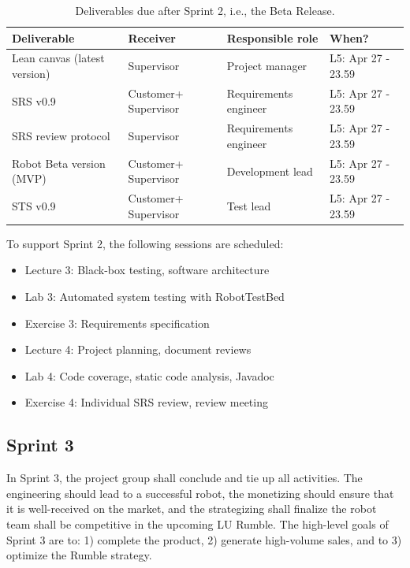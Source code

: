 \documentclass{scrreprt}
\begin{document}
\begin{table}[]
\centering
\caption{Deliverables due after Sprint 2, i.e., the Beta Release.}
\label{tab:sprint2}
\begin{tabular}{|p{4cm}|p{2cm}|p{2.5cm}|p{4.5cm}|}
\hline
\textbf{Deliverable}           & \textbf{Receiver}   & \textbf{Responsible role} & \textbf{When?}     \\ \hline
Lean canvas (latest version)   & Supervisor          & Project manager           & L5: Apr 27 - 23.59 \\ \hline
SRS v0.9                       & Customer+ Supervisor & Requirements engineer     & L5: Apr 27 - 23.59 \\ \hline
SRS review protocol            & Supervisor & Requirements engineer     & L5: Apr 27 - 23.59 \\ \hline
Robot Beta version (MVP)       & Customer+ Supervisor & Development lead          & L5: Apr 27 - 23.59  \\ \hline
STS v0.9        			   & Customer+ Supervisor & Test lead                 & L5: Apr 27 - 23.59  \\ \hline
\end{tabular}
\end{table}

To support Sprint 2, the following sessions are scheduled:
\begin{itemize}
\item Lecture 3: Black-box testing, software architecture 
\item Lab 3: Automated system testing with RobotTestBed
\item Exercise 3: Requirements specification
\item Lecture 4: Project planning, document reviews
\item Lab 4: Code coverage, static code analysis, Javadoc
\item Exercise 4: Individual SRS review, review meeting
\end{itemize}

\subsection{Sprint 3}
In Sprint 3, the project group shall conclude and tie up all activities. The engineering should lead to a successful robot, the monetizing should ensure that it is well-received on the market, and the strategizing shall finalize the robot team shall be competitive in the upcoming LU Rumble. The high-level goals of Sprint 3 are to: 1) complete the product, 2) generate high-volume sales, and to 3) optimize the Rumble strategy.
\end{document}
